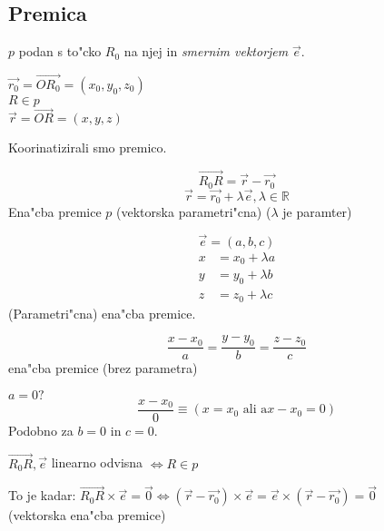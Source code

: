 \subsection{Premica}
$p$ podan s to"cko $R_0$ na njej in \emph{smernim vektorjem} $\vec{e}$.

$\vec{r_0} = \vec{OR_0} = (x_0, y_0, z_0)$\\
$R \in p$\\
$\vec{r} = \vec{OR} = (x, y, z)$

Koorinatizirali smo premico.

\[\vec{R_0R} = \vec{r} - \vec{r_0}\]
\[\vec{r} = \vec{r_0} + \lambda \vec{e}, \lambda \in \mathbb{R}\]
Ena"cba premice $p$ (vektorska parametri"cna) ($\lambda$ je paramter)

\[\vec{e} = (a, b, c)\]
\begin{align*}
	x &= x_0 + \lambda a\\
	y &= y_0 + \lambda b\\
	z &= z_0 + \lambda c
\end{align*}
(Parametri"cna) ena"cba premice.

\[
\frac{x - x_0}{a} = \frac{y - y_0}{b} = \frac{z - z_0}{c}
\]
ena"cba premice (brez parametra)

$a = 0 ?$
\[\frac{x - x_0}{0} \equiv (x = x_0 \text{ ali a} x - x_0 = 0)\]
Podobno za $b = 0$ in $c = 0$.

$\vec{R_0R}, \vec{e}$ linearno odvisna $\Leftrightarrow R \in p$

To je kadar: $\vec{R_0R} \times \vec{e} = \vec{0} \Leftrightarrow (\vec{r} - \vec{r_0}) \times \vec{e} = \vec{e} \times (\vec{r} - \vec{r_0}) = \vec{0}$\\
(vektorska ena"cba premice)